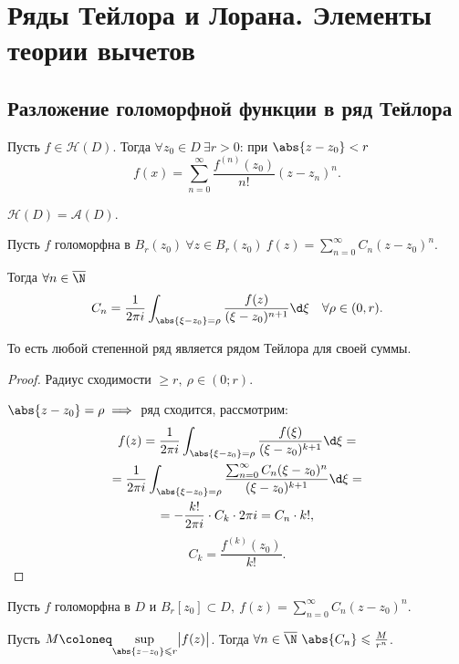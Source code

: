\newpage



\section{Ряды Тейлора и Лорана. Элементы теории вычетов}

\subsection{Разложение голоморфной функции в ряд Тейлора}

\begin{theorem}
	Пусть $f \in \mathcal{H}(D)$. Тогда $\forall z_0 \in D \ \exists r > 0$: при $\abs{z-z_0} < r$
	\[
		f(x) = \sum_{n=0}^{\infty } \frac{f^{(n)} (z_0)}{n!} (z - z_n)^n.
	\]
\end{theorem}

\begin{corollary}
	$\mathcal{H}(D) = \mathcal{A}(D)$.
\end{corollary}

\begin{theorem}
	Пусть $f$ голоморфна в $B_r(z_0) \ \forall z \in B_r(z_0) \ f(z) = \sum_{n=0}^{\infty } C_n (z-z_0)^n$.

	Тогда $\forall n \in \overline{\N}$
	\[
		C_n = \frac{1}{2\pi i} \int_{\abs{\xi -z_0} = \rho} \frac{f(z)}{(\xi - z_0)^{n+1} } \d \xi \quad \forall \rho \in (0,r).
	\]

	То есть любой степенной ряд является рядом Тейлора для своей суммы.
\end{theorem}

\begin{proof}
	Радиус сходимости $\geqslant r, \ \rho \in (0 ; r)$.

	$\abs{z-z_0} = \rho \implies $ ряд сходится, рассмотрим:
	\begin{multline*}
		f(z) = \frac{1}{2\pi i} \int_{\abs{\xi -z_0}= \rho } \frac{f(\xi )}{(\xi -z_0)^{k+1} } \d \xi = \\
		= \frac{1}{2\pi i} \int_{\abs{\xi -z_0} = \rho } \frac{\sum_{n=0}^{\infty } C_n(\xi -z_0)^n}{(\xi -z_0)^{k+1} } \d \xi = \\
		= -\frac{k!}{2\pi i} \cdot C_k \cdot 2\pi i = C_n \cdot k!,
	\end{multline*}
	\[
		C_k = \frac{f^{(k)} (z_0)}{k!} .
	\]
\end{proof}

\begin{theorem}
	Пусть $f$ голоморфна в $D$ и $B_r[z_0] \subset D, \ f(z) = \sum_{n=0}^{\infty } C_n(z-z_0)^n$.

	Пусть $M \coloneq \underset{\abs{z-z_0} \leqslant r}{\sup} \big|f(z)\big|$. Тогда $\forall n \in \overline{\N} \ \abs{C_n}  \leqslant \frac{M}{r^n} $.
\end{theorem}

